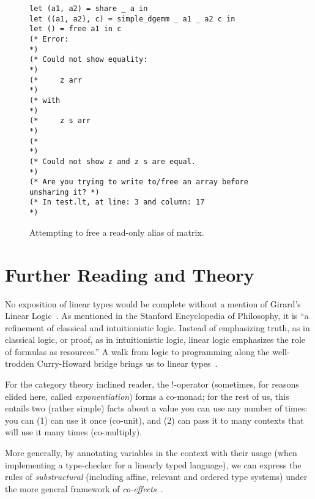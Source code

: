 \begin{figure}[tp]
    \begin{verbatim}
let (a1, a2) = share _ a in
let ((a1, a2), c) = simple_dgemm _ a1 _ a2 c in
let () = free a1 in c
(* Error:                                                        *)
(* Could not show equality:                                      *)
(*     z arr                                                     *)
(* with                                                          *)
(*     z s arr                                                   *)
(*                                                               *)
(* Could not show z and z s are equal.                           *)
(* Are you trying to write to/free an array before unsharing it? *)
(* In test.lt, at line: 3 and column: 17                         *)
    \end{verbatim}
    \caption{Attempting to free a read-only alias of matrix.}\label{fig:ltfla_free}
\end{figure}

\section{Further Reading and Theory}\label{sec:further}


No exposition of linear types would be complete without a mention of Girard's
Linear Logic~\cite{girard}. As mentioned in the Stanford Encyclopedia of
Philosophy, it is ``a refinement of classical and intuitionistic logic. Instead
of emphasizing truth, as in classical logic, or proof, as in intuitionistic
logic, linear logic emphasizes the role of formulas as resources.'' A walk from
logic to programming along the well-trodden Curry-Howard bridge brings us to
linear types~\cite{wadler}.

For the category theory inclined reader, the !-operator (sometimes, for reasons
elided here, called \emph{exponentiation}) forms a co-monad; for the rest of
us, this entails two (rather simple) facts about a value you can use any number
of times: you can (1) can use it once (co-unit), and (2) can pass it to many
contexts that will use it many times (co-multiply).

More generally, by annotating variables in the context with their usage (when
implementing a type-checker for a linearly typed language), we can express the
rules of \emph{substructural} (including affine, relevant and ordered type
systems) under the more general framework of \emph{co-effects}~\cite{petricek}.

